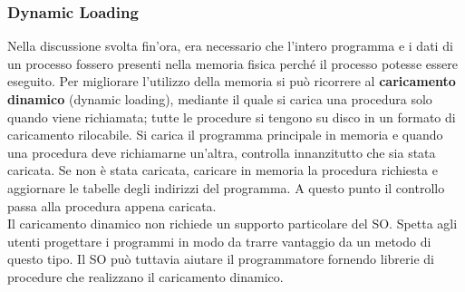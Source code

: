 \documentclass{article}
\begin{document}
			\subsubsection{Dynamic Loading}
				Nella discussione svolta fin’ora, era necessario che l’intero programma e i dati di un processo fossero presenti nella memoria fisica perché il processo potesse essere eseguito. Per migliorare l’utilizzo della memoria si può ricorrere al \textbf{caricamento dinamico} (dynamic loading), mediante il quale si carica una procedura solo quando viene richiamata; tutte le procedure si tengono su disco in un formato di caricamento rilocabile. Si carica il programma principale in memoria e quando una procedura deve richiamarne un’altra, controlla innanzitutto che sia stata caricata. Se non è stata caricata, caricare in memoria la procedura richiesta e aggiornare le tabelle degli indirizzi del programma. A questo punto il controllo passa alla procedura appena caricata.
				\\Il caricamento dinamico non richiede un supporto particolare del SO. Spetta agli utenti progettare i programmi in modo da trarre vantaggio da un metodo di questo tipo. Il SO può tuttavia aiutare il programmatore fornendo librerie di procedure che realizzano il caricamento dinamico.
			
\end{document}
